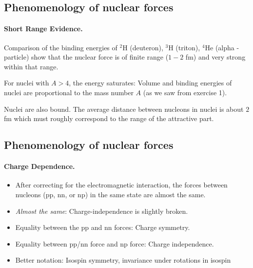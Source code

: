 \documentclass[%
twoside,                 %
final,                   %
10pt]{article}
\begin{document}
\noindent



\subsection*{Phenomenology of nuclear forces}

\paragraph{Short Range Evidence.}
Comparison of the binding energies of
${}^2\mbox{H}$ (deuteron), ${}^3\mbox{H}$ (triton), ${}^4\mbox{He}$ (alpha - particle) show that the nuclear force is of finite range ($1-2$ fm) and very strong within that range.

For nuclei with $A>4$, the energy saturates: Volume and binding energies of nuclei are proportional to the mass number $A$ (as we saw from exercise 1).

Nuclei are also bound. The average distance
between nucleons in nuclei is about $2$ fm which
must roughly correspond to the range of the
attractive part.



\subsection*{Phenomenology of nuclear forces}

\paragraph{Charge Dependence.}

\begin{itemize}
 \item After correcting for the electromagnetic interaction, the forces between nucleons (pp, nn, or np) in the same state are almost the same.

 \item \emph{Almost the same}: Charge-independence is slightly broken.

 \item Equality between the pp and nn forces: Charge symmetry.

 \item Equality between pp/nn force and np force: Charge independence.

 \item Better notation: Isospin symmetry, invariance under rotations in isospin
\end{itemize}
\end{document}
